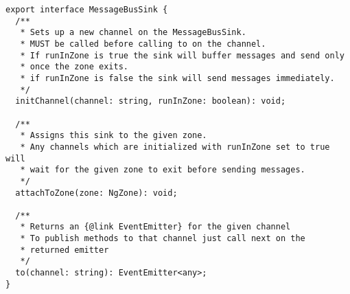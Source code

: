 \begin{verbatim}
export interface MessageBusSink {
  /**
   * Sets up a new channel on the MessageBusSink.
   * MUST be called before calling to on the channel.
   * If runInZone is true the sink will buffer messages and send only
   * once the zone exits.
   * if runInZone is false the sink will send messages immediately.
   */
  initChannel(channel: string, runInZone: boolean): void;

  /**
   * Assigns this sink to the given zone.
   * Any channels which are initialized with runInZone set to true will
   * wait for the given zone to exit before sending messages.
   */
  attachToZone(zone: NgZone): void;

  /**
   * Returns an {@link EventEmitter} for the given channel
   * To publish methods to that channel just call next on the
   * returned emitter
   */
  to(channel: string): EventEmitter<any>;
}
\end{verbatim}

